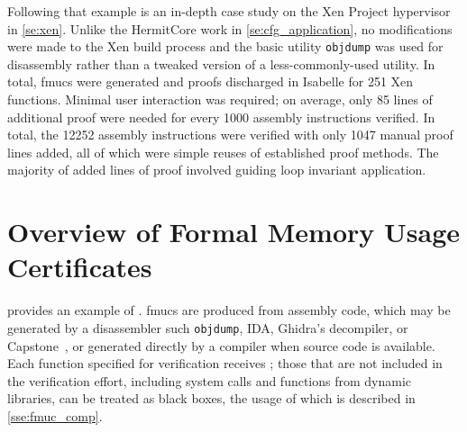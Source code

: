 Following that example is an in-depth case study
on the Xen Project hypervisor~\citep{chisnall2008definitive} in \cref{se:xen}.
Unlike the HermitCore work in \cref{se:cfg_application},
no modifications were made to the Xen build process
and the basic utility \texttt{objdump} was used for disassembly
rather than a tweaked version of a less-commonly-used utility.
In total, \acp{fmuc} were generated and proofs discharged in Isabelle
for 251 Xen functions.
Minimal user interaction was required;
on average, only \num{85} lines of additional proof were needed
for every \num{1000} assembly instructions verified.
In total, the \num{12252} assembly instructions
were verified with only \num{1047} manual proof lines added,
all of which were simple reuses of established proof methods.
The majority of added lines of proof involved guiding loop invariant application.

\section{Overview of Formal Memory Usage Certificates}\label{se:fmuc_overview}
 provides an example of .
\Acp{fmuc} are produced from assembly code,
which may be generated by a disassembler such \texttt{objdump},
IDA,
Ghidra's decompiler, or Capstone~\citep{capstone},
or generated directly by a compiler when source code is available.
Each function specified for verification receives ;
those that are not included in the verification effort,%
including system calls and functions from dynamic libraries,
can be treated as black boxes,
the usage of which is described in \cref{sse:fmuc_comp}.

